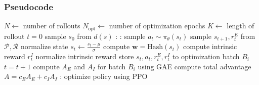 \documentclass{beamer}
\begin{document}
\begin{frame}[shrink]
  \frametitle{Pseudocode}
	\begin{algorithmic}
		\State $N \gets$ number of rollouts
		\State $N_\text{opt} \gets$ number of optimization epochs
		\State $K \gets$ length of rollout
		\State $t = 0$
		\State sample $s_0$ from $d(s)$
		:
			:
				\State sample $a_t \sim \pi_\theta(s_t)$
				\State sample $s_{t+1}, r_t^E$ from $\mathcal{P}, \mathcal{R}$
				\State normalize state $s_t \gets \frac{s_t - \mu}{\sigma}$
				\State compute $\mathbf{w} = \text{Hash}(s_t)$
				\State compute intrinsic reward $r_t^I$
				\State normalize intrinsic reward
				\State store $s_t, a_t, r_t^E, r_t^I$ to optimization batch $B_i$
				\State $t = t+1$
			\EndFor
			\State compute $A_E$ and $A_I$ for batch $B_i$ using GAE
			\State compute total advantage $A = c_E A_E + c_I A_I$
			:
				\State optimize policy using PPO
			\EndFor
		\EndFor
	\end{algorithmic}
\end{frame}
\end{document}
